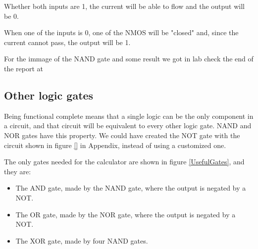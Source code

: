 \documentclass{article}
\begin{document}
Whether both inputs are 1, the current will be able to flow and the output will be 0.

\vspace{1mm}

When one of the inputs is 0, one of the NMOS will be "closed" and, since the current cannot pass, the output will be 1.

\vspace{3mm}

For the immage of the NAND gate and some result we got in lab check the end of the report at %



\subsection{Other logic gates} \label{OtherGates}

Being functional complete means that a single logic can be the only component in a circuit, and that circuit will be equivalent to every other logic gate. NAND and NOR gates have this property. We could have created the NOT gate with the circuit shown in figure \ref{} in Appendix, instead of using a customized one. %

\clearpage

The only gates needed for the calculator are shown in figure \ref{UsefulGates}, and they are: 

\begin{itemize}
\item The AND gate, made by the NAND gate, where the output is negated by a NOT.
\item The OR gate, made by the NOR gate, where the output is negated by a NOT.
\item The XOR gate, made by four NAND gates.
\end{itemize}
\end{document}
